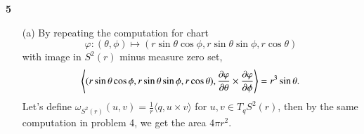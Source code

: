 \documentclass[a4paper, 12pt]{article}
\theoremstyle{Mydefinition}
\theoremstyle{Mytheorem}
\begin{document}
\noindent \textbf{5}
\begin{enumerate}
    \item[(a)] By repeating the computation for chart
    \begin{equation*}
        \varphi:(\theta,\phi)\mapsto (r\sin\theta\cos\phi, r\sin\theta\sin\phi, r\cos\theta)
    \end{equation*}
    with image in $S^2(r)$ minus measure zero set,
    \begin{equation*}
        \left\langle (r\sin\theta\cos\phi, r\sin\theta\sin\phi, r\cos\theta), \pdv{\varphi}{\theta}\times \pdv{\varphi}{\phi} \right\rangle = r^3\sin\theta.
    \end{equation*}
    Let's define $\omega_{S^2(r)}(u,v) = \frac{1}{r}\langle q, u\times v\rangle$ for $u,v\in T_qS^2(r)$, then by the same computation in problem 4, we get the area $4\pi r^2$.
    

\end{enumerate}
\end{document}
